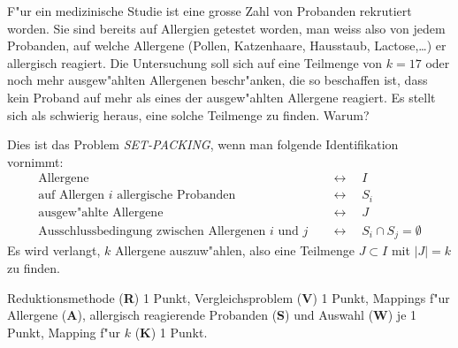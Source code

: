 F"ur ein medizinische Studie ist eine grosse Zahl von Probanden rekrutiert
worden.
Sie sind bereits auf Allergien getestet worden, man weiss also von jedem
Probanden, auf welche Allergene (Pollen, Katzenhaare, Hausstaub, Lactose,\dots)
er allergisch reagiert.
Die Untersuchung soll sich auf eine Teilmenge von $k=17$ oder noch
mehr ausgew"ahlten
Allergenen beschr"anken, die so beschaffen ist, dass kein Proband auf mehr als 
eines der ausgew"ahlten Allergene reagiert.
Es stellt sich als schwierig heraus, eine solche Teilmenge zu finden.
Warum?

\begin{loesung}
Dies ist das Problem {\em SET-PACKING}, wenn man folgende Identifikation
vornimmt:
\begin{align*}
\text{Allergene}                            &\quad\leftrightarrow\quad I\\
\text{auf Allergen $i$ allergische Probanden}&\quad\leftrightarrow\quad S_i\\
\text{ausgew"ahlte Allergene}               &\quad\leftrightarrow\quad J\\
\text{Ausschlussbedingung zwischen Allergenen $i$ und $j$}&\quad\leftrightarrow\quad S_i\cap S_j = \emptyset
\end{align*}
Es wird verlangt, $k$ Allergene auszuw"ahlen, also eine Teilmenge
$J\subset I$ mit $|J|=k$ zu finden.
\end{loesung}

\begin{bewertung}
Reduktionsmethode ({\bf R}) 1 Punkt,
Vergleichsproblem ({\bf V}) 1 Punkt,
Mappings f"ur Allergene ({\bf A}), allergisch reagierende Probanden ({\bf S})
und Auswahl ({\bf W}) je 1 Punkt,
Mapping f"ur $k$ ({\bf K}) 1 Punkt.
\end{bewertung}

